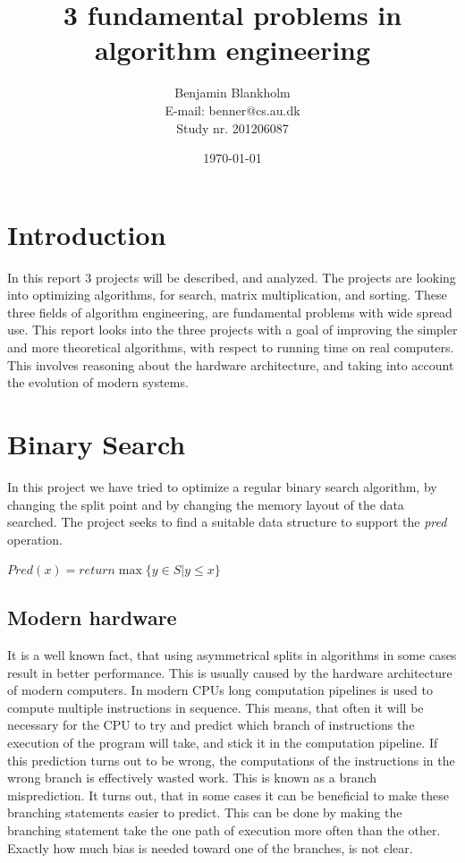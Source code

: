 \documentclass{article}
\title{3 fundamental problems in algorithm engineering}
\author{Benjamin Blankholm \\
		E-mail: benner@cs.au.dk \\
		Study nr. 201206087}
\date{\today}
\begin{document}
\maketitle
\newpage

\section{Introduction}
In this report 3 projects will be described, and analyzed. The projects are looking into optimizing algorithms, for search, matrix multiplication, and sorting. These three fields of algorithm engineering, are fundamental problems with wide spread use.
This report looks into the three projects with a goal of improving the simpler and more theoretical algorithms, with respect to running time on real computers. This involves reasoning about the hardware architecture, and taking into account the evolution of modern systems. 

\section{Binary Search}
In this project we have tried to optimize a regular binary search algorithm, by changing the split point and by changing the memory layout of the data searched. The project seeks to find a suitable data structure to support the \textit{pred} operation. 
\begin{center}
$Pred(x) = return \max \{ y \in S | y \leq x \}$	
\end{center}

\subsection{Modern hardware}
\label{sec:modern_hardware}
It is a well known fact, that using asymmetrical splits in algorithms in some cases result in better performance. %
This is usually caused by the hardware architecture of modern computers. In modern CPUs long computation pipelines is used to compute multiple instructions in sequence. This means, that often it will be necessary for the CPU to try and predict which branch of instructions the execution of the program will take, and stick it in the computation pipeline. If this prediction turns out to be wrong, the computations of the instructions in the wrong branch is effectively wasted work. This is known as a branch misprediction. It turns out, that in some cases it can be beneficial to make these branching statements easier to predict. This can be done by making the branching statement take the one path of execution more often than the other. Exactly how much bias is needed toward one of the branches, is not clear. 
\end{document}
